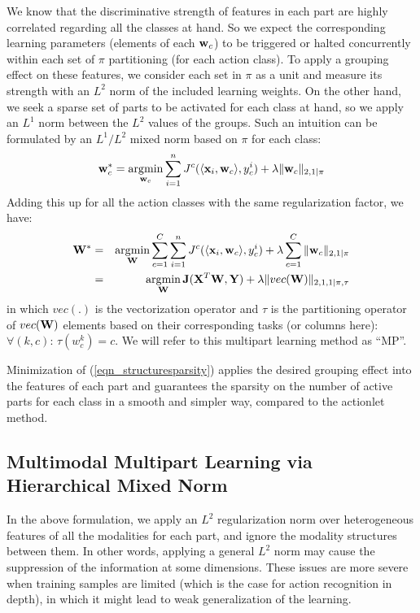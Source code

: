 \documentclass[9pt,technote,compsoc]{IEEEtran}
\begin{document}
We know that the discriminative strength of features in each part are highly correlated regarding all the classes at hand. So we expect the corresponding learning parameters (elements of each ${\bf w}_c$) to be triggered or halted concurrently within each set of $\pi$ partitioning (for each action class). To apply a grouping effect on these features, we consider each set in $\pi$ as a unit and measure its strength with an $L^2$ norm of the included learning weights. On the other hand, we seek a sparse set of parts to be activated for each class at hand, so we apply an $L^1$ norm between the $L^2$ values of the groups. Such an intuition can be formulated by an $L^1/L^2$ mixed norm based on $\pi$ for each class:
\begin{equation}
\label{eqn_singleaction}{\bf w}_c^*=\mathop{\arg\!\min}_{{\bf w}_c}\sum_{i=1}^{n}J^c(\langle{\bf x}_i,{\bf w}_c\rangle,y_c^i)+\lambda \|{\bf w}_c\|_{2,1|\pi}
\end{equation}
Adding this up for all the action classes with the same regularization factor, we have:
\begin{eqnarray}
\label{eqn_multiaction}{\bf W}^*&=&\mathop{\arg\!\min}_{\bf W}{\sum_{c=1}^{C}\sum_{i=1}^{n}J^c(\langle{\bf x}_i,{\bf w}_c\rangle,y_c^i)+\lambda \sum_{c=1}^{C}\|{\bf w}_c\|_{2,1|\pi}}\nonumber\\
\label{eqn_structuresparsity}&=&\mathop{\arg\!\min}_{\bf W}{\bf J}({\bf X}^T{\bf W},{\bf Y})+\lambda\|vec({\bf W})\|_{2,1,1|\pi,\tau}
\end{eqnarray}
in which $vec(.)$ is the vectorization operator and $\tau$ is the partitioning operator of $vec({\bf W})$ elements based on their corresponding tasks (or columns here): $\forall (k,c):\hspace{2pt}\tau(w_c^k)=c$. We will refer to this multipart learning method as ``MP''.

Minimization of (\ref{eqn_structuresparsity}) applies the desired grouping effect into the features of each part and guarantees the sparsity on the number of active parts for each class in a smooth and simpler way, compared to the actionlet method.

\subsection{Multimodal Multipart Learning via Hierarchical Mixed Norm}


In the above formulation, we apply an $L^2$ regularization norm over heterogeneous features of all the modalities for each part, and ignore the modality structures between them. In other words, applying a general $L^2$ norm may cause the suppression of the information at some dimensions. These issues are more severe when training samples are limited (which is the case for action recognition in depth), in which it might lead to weak generalization of the learning. 
\end{document}
